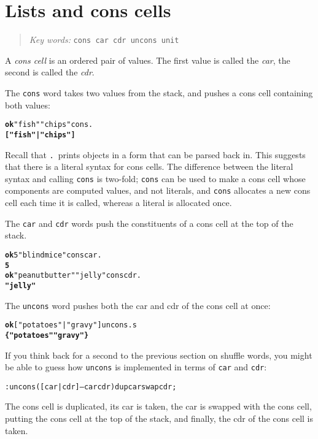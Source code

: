 \documentclass[english]{book}
\newcommand{\chapkeywords}[1]{%
\begin{quote}
\emph{Key words:} \texttt{#1}
\end{quote}
}
\begin{document}
\section{Lists and cons cells}

\chapkeywords{cons car cdr uncons unit}

A \emph{cons cell} is an ordered pair of values. The first value is called the \emph{car},
the second is called the \emph{cdr}.

The \texttt{cons} word takes two values from the stack, and pushes a cons cell containing both values:

\begin{alltt}
\textbf{ok} "fish" "chips" cons .
\textbf{{[} "fish" | "chips" {]}}
\end{alltt}

Recall that \texttt{.}~prints objects in a form that can be parsed back in. This suggests that there is a literal syntax for cons cells. The difference between the literal syntax and calling \texttt{cons} is two-fold; \texttt{cons} can be used to make a cons cell whose components are computed values, and not literals, and \texttt{cons} allocates a new cons cell each time it is called, whereas a literal is allocated once.

The \texttt{car} and \texttt{cdr} words push the constituents of a cons cell at the top of the stack.

\begin{alltt}
\textbf{ok} 5 "blind mice" cons car .
\textbf{5}
\textbf{ok} "peanut butter" "jelly" cons cdr .
\textbf{"jelly"}
\end{alltt}

The \texttt{uncons} word pushes both the car and cdr of the cons cell at once:

\begin{alltt}
\textbf{ok} {[} "potatoes" | "gravy" {]} uncons .s
\textbf{\{ "potatoes" "gravy" \}}
\end{alltt}

If you think back for a second to the previous section on shuffle words, you might be able to guess how \texttt{uncons} is implemented in terms of \texttt{car} and \texttt{cdr}:

\begin{alltt}
: uncons ( {[} car | cdr {]} -- car cdr ) dup car swap cdr ;
\end{alltt}

The cons cell is duplicated, its car is taken, the car is swapped with the cons cell, putting the cons cell at the top of the stack, and finally, the cdr of the cons cell is taken.
\end{document}
